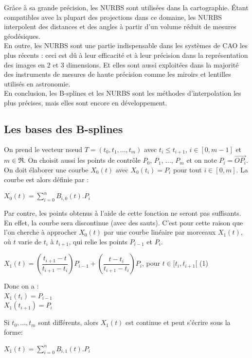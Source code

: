 \documentclass{article}
\begin{document}
\indent
Gr\^ace \`a sa grande pr\'ecision, les NURBS sont utilis\'ees dans la cartographie. \'Etant compatibles avec la plupart des projections dans ce domaine, les NURBS interpolent des distances et des angles \`a partir d'un volume r\'eduit de mesures g\'eod\'esiques.\\
\indent
En outre, les NURBS sont une partie indispensable dans les syst\`emes de CAO les plus r\'ecents : ceci est d\^u \`a leur efficacit\'e et \`a leur pr\'ecision dans la repr\'esentation des images en 2 et 3 dimensions. Et  elles sont aussi exploit\'ees dans la majorit\'e des instruments de mesures de haute pr\'ecision comme les miroirs et lentilles utilis\'es en astronomie. \\
\indent
En conclusion, les B-splines et les NURBS sont les m\'ethodes d'interpolation les plus pr\'ecises, mais elles sont encore en d\'eveloppement.

\subsection{Les bases des B-splines}
On prend le vecteur n\oe ud $T=(t_{0},t_{1},...,t_{m})$ avec $t_{i} \leq t_{i+1}$, $i\in[0,m-1]$ et $m\in\Re$.
On choisit aussi les points de contr\^ole $P_{0}$, $P_{1}$, ..., $P_{m}$ et on note $P_{i}=\overrightarrow{OP_{i}} $.
On doit \'elaborer une courbe $X_{0}(t)$ avec 
$X_{0}(t_{i})=P_{i}$ pour tout $i\in[0,m]$. La courbe est alors d\'efinie par :
\begin{center}$X_{0}(t) =\sum\limits_{i=0}^n B_{i,0}(t) . P_{i}$ \end{center}

Par contre, les points obtenus \`a l'aide de cette fonction ne seront pas suffisants. En effet, la courbe sera discontinue (avec des sauts).
C'est pour cette raison que l'on cherche \`a approcher $X_{0}(t)$ par une courbe lin\'eaire par morceaux $X_{1}(t)$, o\`u $t$ varie de $t_{i}$ \`a $t_{i+1}$, qui relie les points $P_{i-1}$ et $P_{i}$.
\begin{center}$X_{1}(t) = (\dfrac{t_{i+1}-t}{t_{i+1}-t_{i}})P_{i-1}+ (\dfrac{t-t_{i}}{t_{i+1}-t_{i}})P_{i}$, pour $t\in [t_{i},t_{i+1}[$ (1)\end{center}
Donc on a :
\\$X_{1}(t_{i}) = P_{i-1}$ 
\\$X_{1}(t_{i+1}) = P_{i}$

Si $t_{0},...,t_{m}$ sont diff\'erents, alors $X_{1}(t)$ est continue et peut s'\'ecrire sous la forme: 
\begin{center}$X_{1}(t) =\sum\limits_{i=0}^n B_{i,1}(t) . P_{i}$ \end{center}
\end{document}
